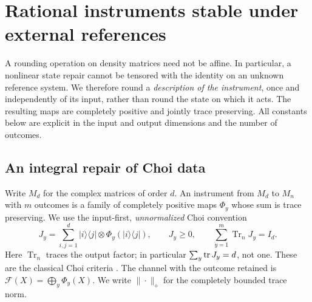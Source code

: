 \section{Rational instruments stable under external references}\label{sec:reference66}
A rounding operation on density matrices need not be affine. In
particular, a nonlinear state repair cannot be tensored with the
identity on an unknown reference system. We therefore round a
\emph{description of the instrument}, once and independently of its
input, rather than round the state on which it acts. The resulting
maps are completely positive and jointly trace preserving. All
constants below are explicit in the input and output dimensions and
the number of outcomes.

\subsection{An integral repair of Choi data}
Write $M_d$ for the complex matrices of order $d$. An instrument from
$M_d$ to $M_n$ with $m$ outcomes is a family of completely positive
maps $\Phi_y$ whose sum is trace preserving. We use the input-first,
\emph{unnormalized} Choi convention
\begin{equation}\label{eq:choiconvention66}
 J_y=\sum_{i,j=1}^d |i\rangle\langle j|\otimes
                     \Phi_y(|i\rangle\langle j|),\qquad
 J_y\ge0,\qquad \sum_{y=1}^m\operatorname{Tr}_{n}J_y=I_d.
\end{equation}
Here $\operatorname{Tr}_{n}$ traces the output factor; in particular
$\sum_y\operatorname{tr} J_y=d$, not one. These are the classical Choi criteria
\cite[Theorems~2.22 and~2.26]{Watrous65}. The channel with the outcome
retained is $\mathcal F(X)=\bigoplus_y\Phi_y(X)$. We write $\|\cdot\|_\diamond$
for the completely bounded trace norm.

